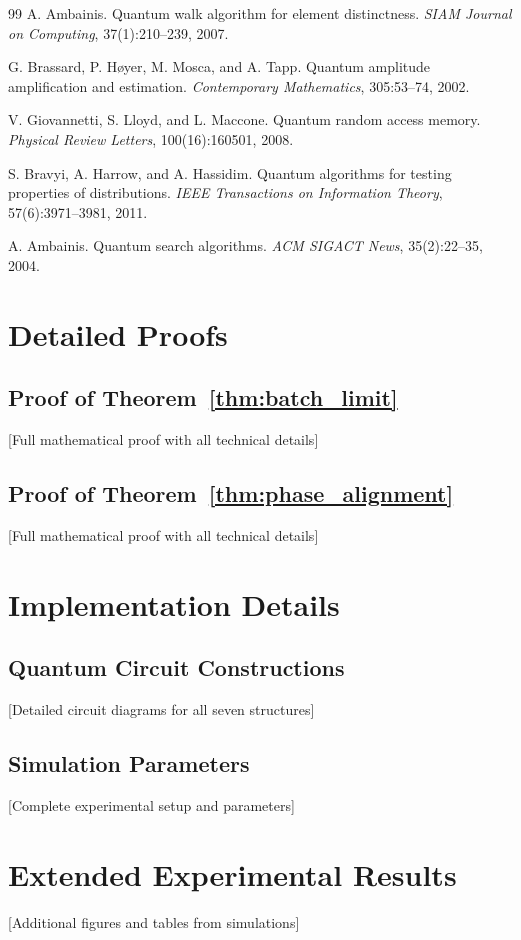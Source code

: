\documentclass[11pt,letterpaper]{article}
\begin{document}
\begin{thebibliography}{99}
A. Ambainis.
\newblock Quantum walk algorithm for element distinctness.
\newblock \textit{SIAM Journal on Computing}, 37(1):210--239, 2007.

G. Brassard, P. Høyer, M. Mosca, and A. Tapp.
\newblock Quantum amplitude amplification and estimation.
\newblock \textit{Contemporary Mathematics}, 305:53--74, 2002.

V. Giovannetti, S. Lloyd, and L. Maccone.
\newblock Quantum random access memory.
\newblock \textit{Physical Review Letters}, 100(16):160501, 2008.

S. Bravyi, A. Harrow, and A. Hassidim.
\newblock Quantum algorithms for testing properties of distributions.
\newblock \textit{IEEE Transactions on Information Theory}, 57(6):3971--3981, 2011.

A. Ambainis.
\newblock Quantum search algorithms.
\newblock \textit{ACM SIGACT News}, 35(2):22--35, 2004.

\end{thebibliography}

\appendix

\section{Detailed Proofs}

\subsection{Proof of Theorem~\ref{thm:batch_limit}}

[Full mathematical proof with all technical details]

\subsection{Proof of Theorem~\ref{thm:phase_alignment}}

[Full mathematical proof with all technical details]

\section{Implementation Details}

\subsection{Quantum Circuit Constructions}

[Detailed circuit diagrams for all seven structures]

\subsection{Simulation Parameters}

[Complete experimental setup and parameters]

\section{Extended Experimental Results}

[Additional figures and tables from simulations]
\end{document}
